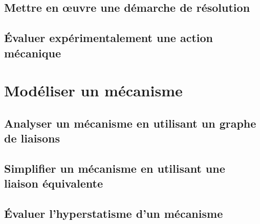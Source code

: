 \graphicspath{{\repStyle/png/}{../STAT/STAT-03-Demarche/05_RT/images/}} 
 
 
\graphicspath{{\repStyle/png/}{../STAT/STAT-03-Demarche/06_TR/images/}} 
 
 
\graphicspath{{\repStyle/png/}{../STAT/STAT-03-Demarche/07_RR3D/images/}} 
 
 
\graphicspath{{\repStyle/png/}{../STAT/STAT-03-Demarche/08_RR3D/images/}} 
 
 
\graphicspath{{\repStyle/png/}{../STAT/STAT-03-Demarche/14_Sympact/images/}} 
 
 
\graphicspath{{\repStyle/png/}{../STAT/STAT-03-Demarche/55_Suspension/images/}} 
 
 
\graphicspath{{\repStyle/png/}{../STAT/STAT-03-Demarche/57_PeseCamion/images/}} 
 
 
\section{Mettre en œuvre une démarche de résolution} 
\section{Évaluer expérimentalement une action mécanique} 
\setchapterpreamble[u]{\margintoc} 
\chapter{Modéliser un mécanisme} 
\section{Analyser un mécanisme en utilisant un graphe de liaisons} 
\section{Simplifier un mécanisme en utilisant une liaison équivalente} 
\section{Évaluer l'hyperstatisme d'un mécanisme} 
\graphicspath{{\repStyle/png/}{../CHS/CHS-03-HS/64_EPAS/images/}} 
 
 
